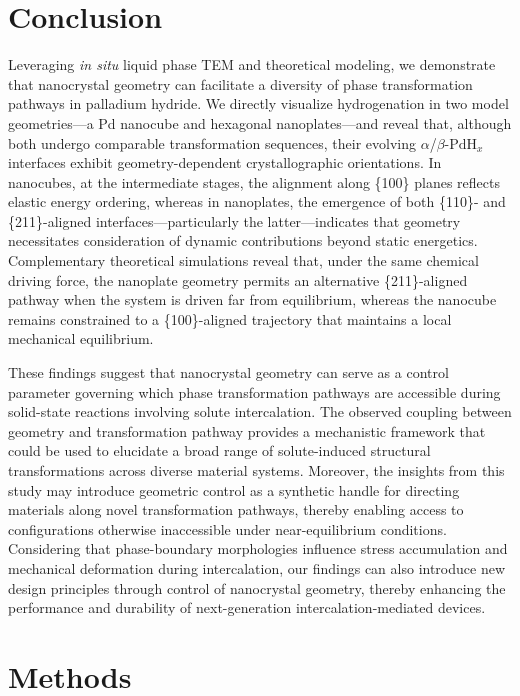 \documentclass[reprint,amsmath,amssymb,aip,nofootinbib, citeautoscript,]{revtex4-2}
\begin{document}
\section*{Conclusion}

Leveraging \textit{in situ} liquid phase TEM and theoretical modeling, we demonstrate that nanocrystal geometry can facilitate a diversity of phase transformation pathways in palladium hydride. We directly visualize hydrogenation in two model geometries—a Pd nanocube and hexagonal nanoplates—and reveal that, although both undergo comparable transformation sequences, their evolving $\alpha$/$\beta$-$\mathrm{PdH}_x$ interfaces exhibit geometry-dependent crystallographic orientations. In nanocubes, at the intermediate stages, the alignment along \{100\} planes reflects elastic energy ordering, whereas in nanoplates, the emergence of both \{110\}- and \{211\}-aligned interfaces—particularly the latter—indicates that geometry necessitates consideration of dynamic contributions beyond static energetics. Complementary theoretical simulations reveal that, under the same chemical driving force, the nanoplate geometry permits an alternative \{211\}-aligned pathway when the system is driven far from equilibrium, whereas the nanocube remains constrained to a \{100\}-aligned trajectory that maintains a local mechanical equilibrium.


These findings suggest that nanocrystal geometry can serve as a control parameter governing which phase transformation pathways are accessible during solid-state reactions involving solute intercalation. The observed coupling between geometry and transformation pathway provides a mechanistic framework that could be used to elucidate a broad range of solute-induced structural transformations across diverse material systems. Moreover, the insights from this study may introduce geometric control as a synthetic handle for directing materials along novel transformation pathways, thereby enabling access to configurations otherwise inaccessible under near-equilibrium conditions. Considering that phase-boundary morphologies influence stress accumulation and mechanical deformation during intercalation, our findings can also introduce new design principles through control of nanocrystal geometry, thereby enhancing the performance and durability of next-generation intercalation-mediated devices.


\section*{Methods}
\end{document}
